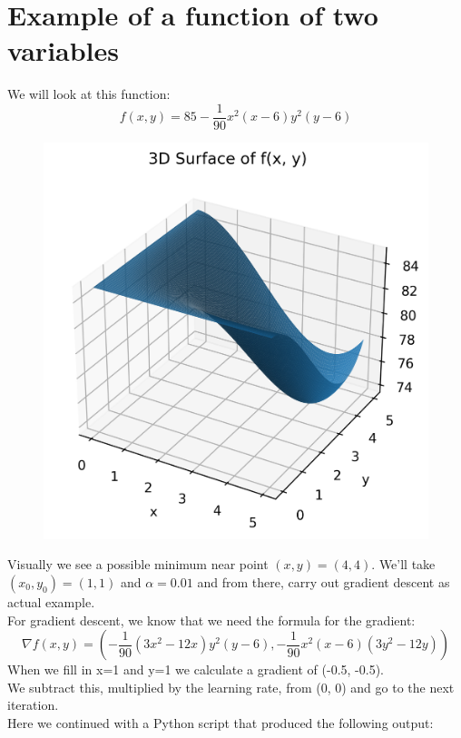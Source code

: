 \documentclass[12pt, letterpaper]{article}
\begin{document}
\section{Example of a function of two variables}
We will look at this function:
\[
f(x,y) = 85 - \frac{1}{90}x^2(x-6)y^2(y-6)
\]
\begin{figure}[H]
    \includegraphics{3D_plot.png}
\end{figure}
Visually we see a possible minimum near point $(x,y) = (4,4)$.
We'll take $(x_0,y_0) = (1,1)$ and $\alpha = 0.01$ and from there, carry out gradient descent as actual example.\\

For gradient descent, we know that we need the formula for the gradient:
\[
\nabla f(x,y) = \left( - \frac{1}{90}(3x^2-12x)y^2(y-6), - \frac{1}{90}x^2(x-6)(3y^2-12y) \right)
\]
When we fill in x=1 and y=1 we calculate a gradient of (-0.5, -0.5).\\
We subtract this, multiplied by the learning rate, from (0, 0) and go to the next iteration.\\
Here we continued with a Python script that produced the following output:\\
\end{document}
